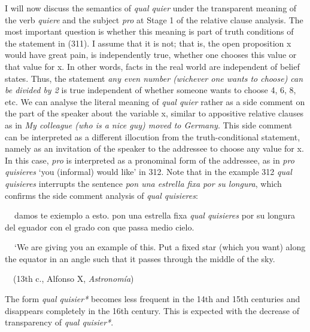 \begin{styleStandard}
I will now discuss the semantics of \textit{qual quier} under the transparent meaning of the verb \textit{quiere} and the subject \textit{pro} at Stage 1 of the relative clause analysis. The most important question is whether this meaning is part of truth conditions of the statement in (311). I assume that it is not; that is, the open proposition x would have great pain, is independently true, whether one chooses this value or that value for x. In other words, facts in the real world are independent of belief states. Thus, the statement \textit{any even number (wichever one wants to choose) can be divided by 2} is true independent of whether someone wants to choose 4, 6, 8, etc. We can analyse the literal meaning of \textit{qual quier} rather as a side comment on the part of the speaker about the variable x, similar to appositive relative clauses as in \textit{My colleague (who is a nice guy) moved to Germany}. This side comment can be interpreted as a different illocution from the truth-conditional statement, namely as an invitation of the speaker to the addressee to choose any value for x. In this case, \textit{pro} is interpreted as a pronominal form of the addressee, as in \textit{pro} \textit{quisieres} ‘you (informal) would like’ in 312. Note that in the example 312 \textit{qual quisieres }interrupts the sentence \textit{pon una estrella fixa por su longura}, which confirms the side comment analysis of \textit{qual quisieres}: 
\end{styleStandard}

\begin{styleStandard}
\textbf{\ \ }damos te exiemplo a esto. pon una estrella fixa \textit{qual quisieres} por su longura del eguador con el grado con que passa medio cielo.
\end{styleStandard}

\begin{styleStandard}
\textbf{\ \ }‘We are giving you an example of this. Put a fixed star (which you want) along the equator in an angle such that it passes through the middle of the sky. 
\end{styleStandard}

\begin{styleListParagraph}
\textmd{\ \ (13th c., Alfonso X, }\textmd{\textit{Astronomía}}\textmd{)}
\end{styleListParagraph}

\begin{styleStandard}
The form \textit{qual quisier*} becomes less frequent in the 14th and 15th centuries and disappears completely in the 16th century. This is expected with the decrease of transparency of \textit{qual quisier*}. 
\end{styleStandard}

